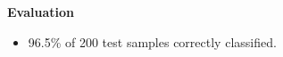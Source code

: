\documentclass[landscape,paper=160mm:90mm,fontsize=10pt,DIV=16]{scrartcl}
\newenvironment{slide}[1]{\clearpage
    {\LARGE\bfseries#1\par}
}{}
\begin{document}
\begin{slide}{Evaluation}
    \centering
    \begin{itemize}
        \item 96.5\% of 200 test samples correctly classified.
    \end{itemize}
    \centering
    \resizebox*{0.9\textwidth}{!}{}
\end{slide}
\end{document}
